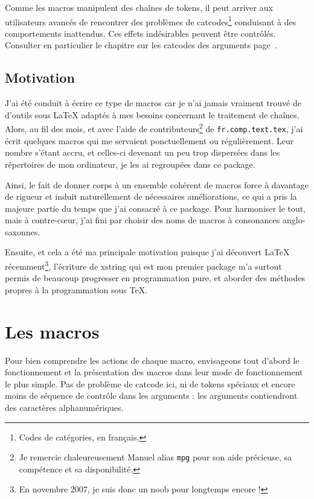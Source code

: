 \documentclass[a4paper,10pt,french]{article}
\newcommand\guill[1]{\og{}#1\fg{}}
\newcommand\Xstring{\textsf{xstring}\xspace}
\begin{document}
Comme les macros manipulent des chaînes de tokens, il peut arriver aux utilisateurs avancés de rencontrer des problèmes de \guill{catcodes\footnote{Codes de catégories, en français.}} conduisant à des comportements inattendus. Ces effets indésirables peuvent être contrôlés. Consulter en particulier le chapitre sur les catcodes des arguments page~\pageref{macrosetoilees}.

\subsection{Motivation}
J'ai été conduit à écrire ce type de macros car je n'ai jamais vraiment trouvé de d'outils sous \LaTeX{} adaptés à mes besoins concernant le traitement de chaînes. Alors, au fil des mois, et avec l'aide de contributeurs\footnote{Je remercie chaleureusement Manuel alias \guill{\nolinkurl{mpg}} pour son aide précieuse, sa compétence et sa disponibilité.} de \nolinkurl{fr.comp.text.tex}, j'ai écrit quelques macros qui me servaient ponctuellement ou régulièrement. Leur nombre s'étant accru, et celles-ci devenant un peu trop dispersées dans les répertoires de mon ordinateur, je les ai regroupées dans ce package.

Ainsi, le fait de donner corps à un ensemble cohérent de macros force à davantage de rigueur et induit naturellement de nécessaires améliorations, ce qui a pris la majeure partie du temps que j'ai consacré à ce package. Pour harmoniser le tout, mais à contre-cœur, j'ai fini par choisir des noms de macros à consonances anglo-saxonnes.\medskip

Ensuite, et cela a été ma principale motivation puisque j'ai découvert \LaTeX{} récemment\footnote{En novembre 2007, je suis donc un \og noob\fg{} pour longtemps encore !}, l'écriture de \Xstring qui est mon premier package m'a surtout permis de beaucoup progresser en programmation pure, et aborder des méthodes propres à la programmation sous \TeX.

\section{Les macros}
Pour bien comprendre les actions de chaque macro, envisageons tout d'abord le fonctionnement et la présentation des macros dans leur mode de fonctionnement le plus simple. Pas de problème de catcode ici, ni de tokens spéciaux et encore moins de séquence de contrôle dans les arguments : les arguments contiendront des caractères alphanumériques.\medskip
\end{document}
